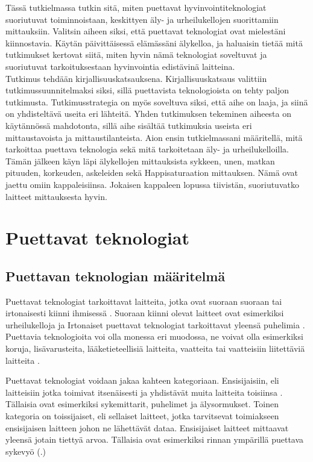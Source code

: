 \documentclass[utf8,bachelor,finnish]{bachelor}
\begin{document}
  Tässä tutkielmassa tutkin sitä, miten puettavat hyvinvointiteknologiat suoriutuvat toiminnoistaan, keskittyen äly- ja urheilukellojen suorittamiin mittauksiin.
   Valitsin aiheen siksi, että puettavat teknologiat ovat mielestäni kiinnostavia. Käytän päivittäisessä elämässäni älykelloa, ja haluaisin tietää mitä tutkimukset kertovat
    siitä, miten hyvin nämä teknologiat soveltuvat ja suoriutuvat tarkoituksestaan hyvinvointia edistävinä laitteina.\\
    
  Tutkimus tehdään kirjallisuuskatsauksena. Kirjallisuuskatsaus valittiin tutkimussuunnitelmaksi siksi, sillä puettavista teknologioista on tehty paljon tutkimusta.
   Tutkimusstrategia on myös soveltuva siksi, että aihe on laaja, ja siinä on yhdisteltävä useita eri lähteitä. Yhden tutkimuksen tekeminen aiheesta on käytännössä mahdotonta,
    sillä aihe sisältää tutkimuksia useista eri mittaustavoista ja mittaustilanteista. Aion ensin tutkielmassani määritellä, mitä tarkoittaa puettava teknologia
     sekä mitä tarkoitetaan äly- ja urheilukelloilla. Tämän jälkeen käyn läpi älykellojen mittauksista sykkeen, unen, matkan pituuden, korkeuden, askeleiden sekä
      Happisaturaation mittauksen. Nämä ovat jaettu omiin kappaleisiinsa. Jokaisen kappaleen lopussa tiivistän, suoriutuvatko laitteet mittauksesta hyvin.

   
\chapter{Puettavat teknologiat}

\section{Puettavan teknologian määritelmä}
  Puettavat teknologiat tarkoittavat laitteita, jotka ovat suoraan suoraan tai irtonaisesti
   kiinni ihmisessä \parencite{godfrey2018z}. Suoraan kiinni olevat laitteet ovat esimerkiksi urheilukelloja ja
    Irtonaiset puettavat teknologiat tarkoittavat yleensä puhelimia \parencite{godfrey2018z}. Puettavia teknologioita voi olla
     monessa eri muodossa, ne voivat olla esimerkiksi koruja, lisävarusteita, lääketieteellisiä laitteita, vaatteita tai
      vaatteisiin liitettäviä laitteita \parencite{Yasar_what_wearable}.
    
  Puettavat teknologiat voidaan jakaa kahteen kategoriaan. Ensisijaisiin, eli laitteisiin jotka toimivat itsenäisesti
   ja yhdistävät muita laitteita toisiinsa \parencite{godfrey2018z}. Tällaisia ovat esimerkiksi sykemittarit, puhelimet ja älysormukset.
    Toinen kategoria on toissijaiset, eli sellaiset laitteet, jotka tarvitsevat toimiakseen ensisijaisen laitteen johon ne lähettävät dataa. 
     Ensisijaiset laitteet mittaavat yleensä jotain tiettyä arvoa. Tällaisia ovat esimerkiksi rinnan ympärillä puettava sykevyö (\cite{godfrey2018z}.) \\
\end{document}
